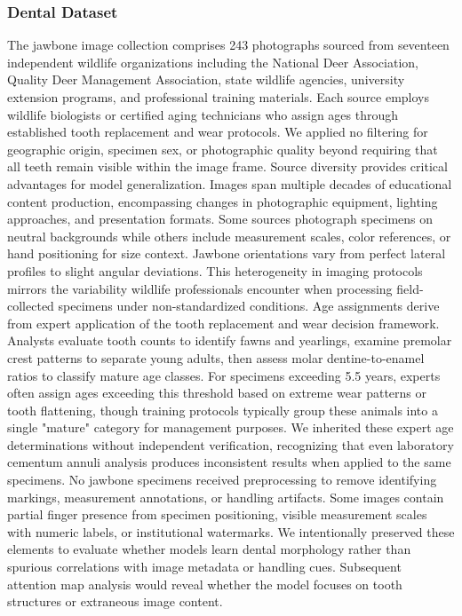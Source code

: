 \documentclass{iopjournal}
\begin{document}
\subsubsection{Dental Dataset}
The jawbone image collection comprises 243 photographs sourced from seventeen independent wildlife organizations including the National Deer Association, Quality Deer Management Association, state wildlife agencies, university extension programs, and professional training materials. Each source employs wildlife biologists or certified aging technicians who assign ages through established tooth replacement and wear protocols. We applied no filtering for geographic origin, specimen sex, or photographic quality beyond requiring that all teeth remain visible within the image frame.
Source diversity provides critical advantages for model generalization. Images span multiple decades of educational content production, encompassing changes in photographic equipment, lighting approaches, and presentation formats. Some sources photograph specimens on neutral backgrounds while others include measurement scales, color references, or hand positioning for size context. Jawbone orientations vary from perfect lateral profiles to slight angular deviations. This heterogeneity in imaging protocols mirrors the variability wildlife professionals encounter when processing field-collected specimens under non-standardized conditions.
Age assignments derive from expert application of the tooth replacement and wear decision framework. Analysts evaluate tooth counts to identify fawns and yearlings, examine premolar crest patterns to separate young adults, then assess molar dentine-to-enamel ratios to classify mature age classes. For specimens exceeding 5.5 years, experts often assign ages exceeding this threshold based on extreme wear patterns or tooth flattening, though training protocols typically group these animals into a single "mature" category for management purposes. We inherited these expert age determinations without independent verification, recognizing that even laboratory cementum annuli analysis produces inconsistent results when applied to the same specimens.
No jawbone specimens received preprocessing to remove identifying markings, measurement annotations, or handling artifacts. Some images contain partial finger presence from specimen positioning, visible measurement scales with numeric labels, or institutional watermarks. We intentionally preserved these elements to evaluate whether models learn dental morphology rather than spurious correlations with image metadata or handling cues. Subsequent attention map analysis would reveal whether the model focuses on tooth structures or extraneous image content.
\end{document}
